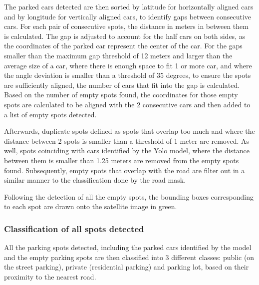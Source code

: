 The parked cars detected are then sorted by latitude for horizontally aligned cars and by longitude for vertically aligned cars, to identify gaps between consecutive cars.
For each pair of consecutive spots, the distance in meters in between them is calculated. The gap is adjusted to account for the half cars on both sides, as the coordinates of the parked car represent the center of the car.
For the gaps smaller than the maximum gap threshold of 12 meters and larger than the average size of a car, where there is enough space to fit 1 or more car, and where the angle deviation is smaller than a threshold of 35 degrees, to ensure the spots are sufficiently aligned, the number of cars that fit into the gap is calculated.
Based on the number of empty spots found, the coordinates for those empty spots are calculated to be aligned with the 2 consecutive cars and then added to a list of empty spots detected.

Afterwards, duplicate spots defined as spots that overlap too much and where the distance between 2 spots is smaller than a threshold of 1 meter are removed.
As well, spots coinciding with cars identified by the Yolo model, where the distance between them is smaller than 1.25 meters are removed from the empty spots found.
Subsequently, empty spots that overlap with the road are filter out in a similar manner to the classification done by the road mask.

Following the detection of all the empty spots, the bounding boxes corresponding to each spot are drawn onto the satellite image in green.

\subsubsection{Classification of all spots detected}
All the parking spots detected, including the parked cars identified by the model and the empty parking spots are then classified into 3 different classes: public (on the street parking), private (residential parking) and parking lot, based on their proximity to the nearest road.

